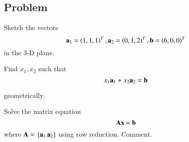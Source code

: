 
\subsection{Problem}

\begin{problem}
Sketch the vectors
%
	\begin{equation}
	\mathbf{a}_1 = \left(1,1,1\right)^T , \mathbf{a}_2=\left(0,1,2\right)^T, \mathbf{b}=\left(6,0,0\right)^T
	\end{equation}
in the 3-D plane.
\end{problem}
%
\begin{problem}
	Find $x_1, x_2$ such that
	\begin{equation}
x_1 \mathbf{a}_1 + x_2 \mathbf{a}_2 = \mathbf{b}
	\end{equation}
\end{problem}
%
geometrically.
\begin{problem}
Solve the matrix equation 
%
\begin{equation}
\mathbf{Ax} = \mathbf{b}
\end{equation}
%
where $\mathbf{A} = {}\left[\mathbf{a}_1 \,\mathbf{a}_2\right]$ using row reduction.  Comment.
\end{problem}
